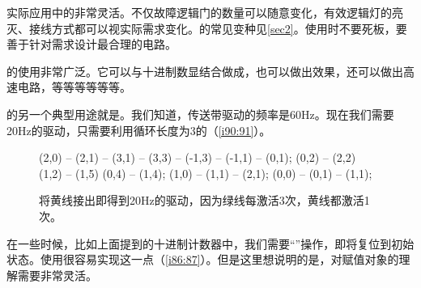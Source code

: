 实际应用中的\ShiftRegister 非常灵活。不仅故障逻辑门的数量可以随意变化，有效逻辑灯的亮灭、接线方式都可以视实际需求变化。\ShiftRegister 的常见变种见\autoref{sec2}。使用\ShiftRegister 时不要死板，要善于针对需求设计最合理的电路。

\ShiftRegister 的使用非常广泛。它可以与十进制数显结合做成，也可以做出效果，还可以做出高速电路，等等等等等等。

\ShiftRegister 的另一个典型用途就是。我们知道，传送带驱动的频率是60Hz。现在我们需要20Hz的驱动，只需要利用循环长度为3的\ShiftRegister（\autoref{i90:91}）。

\begin{figure}[!ht]
  \centering
  \begin{tikzpictureC}[TRsch]

     (2,0) -- (2,1) -- (3,1) -- (3,3) -- (-1,3) -- (-1,1) -- (0,1);
      (0,2) -- (2,2)
      (1,2) -- (1,5)
      (0,4) -- (1,4);
     (1,0) -- (1,1) -- (2,1);
     (0,0) -- (0,1) -- (1,1);
  \end{tikzpictureC}
  \caption{将黄线接出即得到20Hz的驱动，因为绿线每激活3次，黄线都激活1次。}
  \label{i90:91}
\end{figure}

在一些时候，比如上面提到的十进制计数器中，我们需要“”操作，即将\ShiftRegister 复位到初始状态。使用很容易实现这一点（\autoref{i86:87}）。但是这里想说明的是，对赋值对象的理解需要非常灵活。


